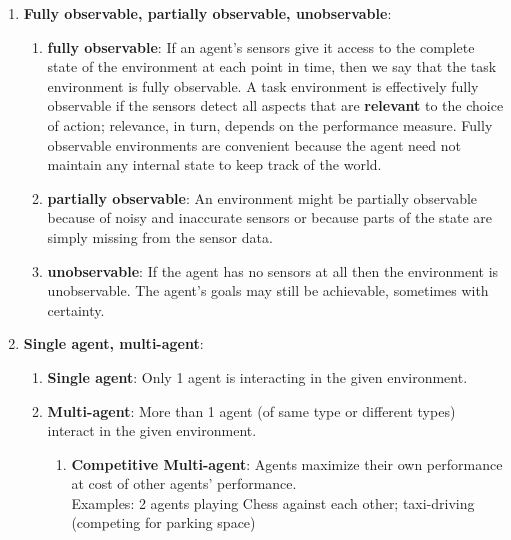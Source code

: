 \begin{enumerate}[itemsep=0.3cm]
    \item \textbf{Fully observable, partially observable, unobservable}:
    \hfill \cite{ai/book/Artificial-Intelligence-A-Modern-Approach/Russell-Norvig}
    \begin{enumerate}
        \item \textbf{fully observable}: If an agent’s sensors give it access to the complete state of the environment at each point in time, then we say that the task environment is fully observable. 
        A task environment is effectively fully observable if the sensors detect all aspects that are \textbf{relevant} to the choice of action; relevance, in turn, depends on the performance measure.
        Fully observable environments are convenient because the agent need not maintain any internal state to keep track of the world. 
        \hfill \cite{ai/book/Artificial-Intelligence-A-Modern-Approach/Russell-Norvig}

        \vspace{0.2cm}

        \item \textbf{partially observable}: An environment might be partially observable because of noisy and inaccurate sensors or because parts of the state are simply missing from the sensor data.
        \hfill \cite{ai/book/Artificial-Intelligence-A-Modern-Approach/Russell-Norvig}

        \vspace{0.2cm}

        \item \textbf{unobservable}: If the agent has no sensors at all then the environment is unobservable. 
        The agent’s goals may still be achievable, sometimes with certainty.
        \hfill \cite{ai/book/Artificial-Intelligence-A-Modern-Approach/Russell-Norvig}
    \end{enumerate}

    \item \textbf{Single agent, multi-agent}: 
    \begin{enumerate}[itemsep=0.1cm]
        \item \textbf{Single agent}:  Only 1 agent is interacting in the given environment.

        \item \textbf{Multi-agent}: More than 1 agent (of same type or different types) interact in the given environment.
        \begin{enumerate}
            \item \textbf{Competitive Multi-agent}: Agents maximize their own performance at cost of other agents' performance.
            \\
            Examples: 2 agents playing Chess against each other; taxi-driving (competing for parking space)


\end{enumerate}
\end{enumerate}
\end{enumerate}
